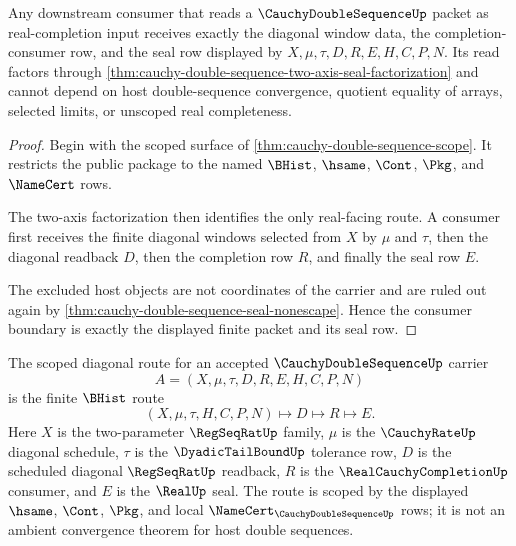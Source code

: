 \begin{theorem}\label{thm:cauchy-double-sequence-real-consumer-boundary}
Any downstream consumer that reads a $\CauchyDoubleSequenceUp$ packet as real-completion input receives exactly the diagonal window data, the completion-consumer row, and the seal row displayed by $X,\mu,\tau,D,R,E,H,C,P,N$. Its read factors through \autoref{thm:cauchy-double-sequence-two-axis-seal-factorization} and cannot depend on host double-sequence convergence, quotient equality of arrays, selected limits, or unscoped real completeness.
\end{theorem}
\begin{proof}
Begin with the scoped surface of \autoref{thm:cauchy-double-sequence-scope}. It restricts the public package to the named $\BHist$, $\hsame$, $\Cont$, $\Pkg$, and $\NameCert$ rows.

The two-axis factorization then identifies the only real-facing route. A consumer first receives the finite diagonal windows selected from $X$ by $\mu$ and $\tau$, then the diagonal readback $D$, then the completion row $R$, and finally the seal row $E$.

The excluded host objects are not coordinates of the carrier and are ruled out again by \autoref{thm:cauchy-double-sequence-seal-nonescape}. Hence the consumer boundary is exactly the displayed finite packet and its seal row.
\end{proof}

\begin{definition}
\label{def:cauchy-double-sequence-scoped-route}
The scoped diagonal route for an accepted $\CauchyDoubleSequenceUp$ carrier
$$
A=(X,\mu,\tau,D,R,E,H,C,P,N)
$$
is the finite $\BHist$ route
$$
(X,\mu,\tau,H,C,P,N)\longmapsto D\longmapsto R\longmapsto E.
$$
Here $X$ is the two-parameter $\RegSeqRatUp$ family, $\mu$ is the $\CauchyRateUp$ diagonal schedule, $\tau$ is the $\DyadicTailBoundUp$ tolerance row, $D$ is the scheduled diagonal $\RegSeqRatUp$ readback, $R$ is the $\RealCauchyCompletionUp$ consumer, and $E$ is the $\RealUp$ seal. The route is scoped by the displayed $\hsame$, $\Cont$, $\Pkg$, and local $\NameCert_{\CauchyDoubleSequenceUp}$ rows; it is not an ambient convergence theorem for host double sequences.
\end{definition}

